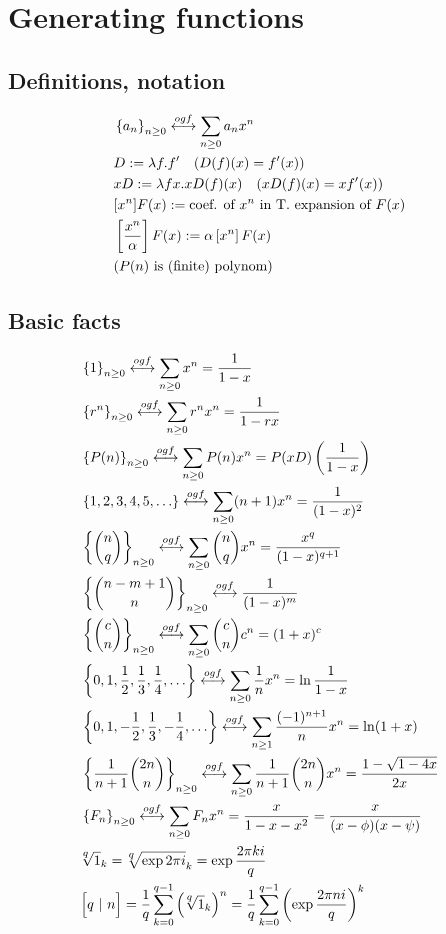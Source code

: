 \section{Generating functions}
\subsection{Definitions, notation}
\begin{align*}
&\left\lbrace a_n\right\rbrace_{n\geq 0} \overset{ogf}{\longleftrightarrow} \sum_{n \geq 0} a_n x^n\\ 
&D := \lambda f . f' ~~~ (D(f)(x) = f'(x))\\
&xD := \lambda f x . x D(f)(x) ~~~ (xD(f)(x) = xf'(x))\\
&[x^n]F(x) := \text{coef. of $x^n$ in T. expansion of $F(x)$}\\
&\left[\dfrac{x^n}{\alpha}\right]F(x) := \alpha \left[x^n\right]F(x)\\
&\text{($P(n)$ is (finite) polynom)}\\
\end{align*}

\subsection{Basic facts}
\begin{align*}
&\nseq{1} \ogf \sum_{n \geq 0} x^n = \dfrac{1}{1-x}\\
&\nseq{r^n} \ogf \sum_{n \geq 0} r^n x^n = \dfrac{1}{1-rx}\\
&\nseq{P(n)} \ogf \sum_{n \geq 0} P(n) x^n = P(xD) \left(\dfrac{1}{1-x}\right)\\
&\seq{1,2,3,4,5,\ldots} \ogf \sum_{n \geq 0} (n+1) x^n = \dfrac{1}{(1-x)^2}\\
&\nseq{{n \choose q}} \ogf \sum_{n\geq 0}{n \choose q} x^n =  \dfrac{x^q}{(1-x)^{q+1}}\\
&\nseq{{n - m + 1 \choose n}} \ogf \dfrac{1}{(1-x)^m}\\
&\nseq{{c \choose n}} \ogf \sum_{n \geq 0} {c \choose n} c^n = (1+x)^c\\
&\seq{0, 1, \dfrac{1}{2}, \dfrac{1}{3}, \dfrac{1}{4}, \ldots} \ogf \sum_{n \geq 0} \dfrac{1}{n} x^n = \ln \dfrac{1}{1-x}\\
&\seq{0, 1, -\dfrac{1}{2}, \dfrac{1}{3}, -\dfrac{1}{4}, \ldots} \ogf \sum_{n \geq 1} \dfrac{(-1)^{n+1}}{n} x^n = \ln(1+x) \\
&\nseq{\dfrac{1}{n+1} {2n \choose n}} \ogf \sum_{n \geq 0} \dfrac{1}{n+1} {2n \choose n} x^n = \dfrac{1 - \sqrt{1 - 4x}}{2x} \\
&\nseq{F_n} \ogf \sum_{n \geq 0} F_n x^n = \dfrac{x}{1 - x - x^2} = \dfrac{x}{(x - \phi)(x - \psi)}\\
& \nthroot{q}{1}_{k} = \nthroot{q}{\exp{2\pi i}}_{k} = \exp{\dfrac{2\pi ki}{q}}\\
&\Big[q ~|~ n\Big] = 
\dfrac{1}{q} \sum_{k=0}^{q-1} \left(\nthroot{q}{1}_{k}\right)^n = 
\dfrac{1}{q} \sum_{k=0}^{q-1} \left( \exp{\dfrac{2\pi n i}{q}} \right)^k  \\
\end{align*}

